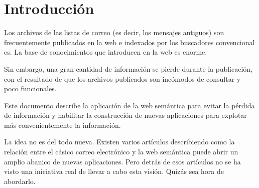 
\section{Introducción}

Los archivos de las listas de correo (es decir, los mensajes antiguos) son
frecuentemente publicados en la web e indexados por los buscadores convencional
es. La base de conocimientos que introducen en la web es enorme.

Sin embargo, una gran cantidad de información se pierde durante la publicación,
con el resultado de que los archivos publicados son incómodos de consultar
y poco funcionales.

Este documento describe la aplicación de la web semántica para evitar la
pérdida de información y habilitar la construcción de nuevas aplicaciones
para explotar más convenientemente la información.

La idea no es del todo nueva\cite{Luke2004}. Existen varios artículos
describiendo como la relación entre el cásico correo electrónico y la
web semántica puede abrir un amplio abanico de nuevas aplicaciones. Pero
detrás de esos artículos no se ha visto una iniciativa real de llevar a
cabo esta visión. Quizás sea hora de abordarlo.
